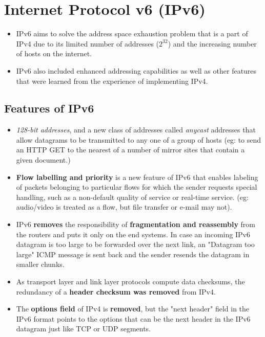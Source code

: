 \documentclass[a4paper]{article}
\theoremstyle{plain}
\theoremstyle{definition}
\begin{document}
\section{Internet Protocol v6 (IPv6)}
\begin{itemize}
    \item IPv6 aims to solve the address space exhaustion problem that is a part of IPv4 due to its limited number of addresses ($2^{32}$) and the increasing number of hosts on the internet. 
    
    \item IPv6 also included enhanced addressing capabilities as well as other features that were learned from the experience of implementing IPv4.
\end{itemize}

\subsection{Features of IPv6}
\begin{itemize}

    \item \textit{128-bit addresses}, and a new class of addresses called \textit{anycast} addresses that allow datagrams to be transmitted to any one of a group of hosts (eg: to send an HTTP GET to the nearest of a number of mirror sites that contain a given document.)
    
    \item \textbf{Flow labelling and priority} is a new feature of IPv6 that enables labeling of packets belonging to particular flows for which the sender requests special handling, such as a non-default quality of service or real-time service. (eg: audio/video is treated as a flow, but file transfer or e-mail may not). 
    
    \item IPv6 \textbf{removes} the responsibility of \textbf{fragmentation and reassembly} from the routers and puts it only on the end systems. In case an incoming IPv6 datagram is too large to be forwarded over the next link, an "Datagram too large" ICMP message is sent back and the sender resends the datagram in smaller chunks.
    
    \item As transport layer and link layer protocols compute data checksums, the redundancy of a \textbf{header checksum was removed} from IPv4.
    
    \item The \textbf{options field} of IPv4 is \textbf{removed}, but the "next header" field in the IPv6 format points to the options that can be the next header in the IPv6 datagram just like TCP or UDP segments. 
\end{itemize}
\end{document}
